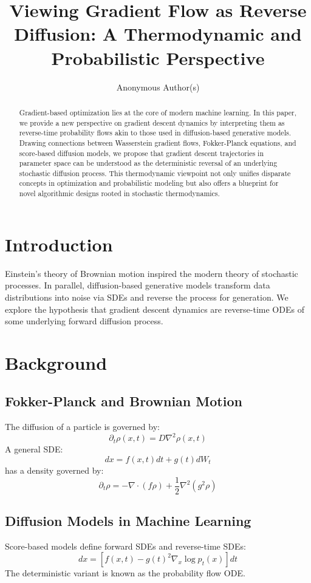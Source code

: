 \documentclass{article}
\title{Viewing Gradient Flow as Reverse Diffusion: A Thermodynamic and Probabilistic Perspective}
\author{Anonymous Author(s)}
\date{}
\begin{document}
\maketitle

\begin{abstract}
Gradient-based optimization lies at the core of modern machine learning. In this paper, we provide a new perspective on gradient descent dynamics by interpreting them as reverse-time probability flows akin to those used in diffusion-based generative models. Drawing connections between Wasserstein gradient flows, Fokker-Planck equations, and score-based diffusion models, we propose that gradient descent trajectories in parameter space can be understood as the deterministic reversal of an underlying stochastic diffusion process. This thermodynamic viewpoint not only unifies disparate concepts in optimization and probabilistic modeling but also offers a blueprint for novel algorithmic designs rooted in stochastic thermodynamics.
\end{abstract}

\section{Introduction}
Einstein's theory of Brownian motion inspired the modern theory of stochastic processes. In parallel, diffusion-based generative models transform data distributions into noise via SDEs and reverse the process for generation. We explore the hypothesis that gradient descent dynamics are reverse-time ODEs of some underlying forward diffusion process.

\section{Background}
\subsection{Fokker-Planck and Brownian Motion}
The diffusion of a particle is governed by:
\[
\partial_t \rho(x,t) = D \nabla^2 \rho(x,t)
\]
A general SDE:
\[
dx = f(x,t)dt + g(t) dW_t
\]
has a density governed by:
\[
\partial_t \rho = -\nabla \cdot (f \rho) + \frac{1}{2} \nabla^2(g^2 \rho)
\]

\subsection{Diffusion Models in Machine Learning}
Score-based models define forward SDEs and reverse-time SDEs:
\[
dx = [f(x,t) - g(t)^2 \nabla_x \log p_t(x)] dt
\]
The deterministic variant is known as the probability flow ODE.
\end{document}
